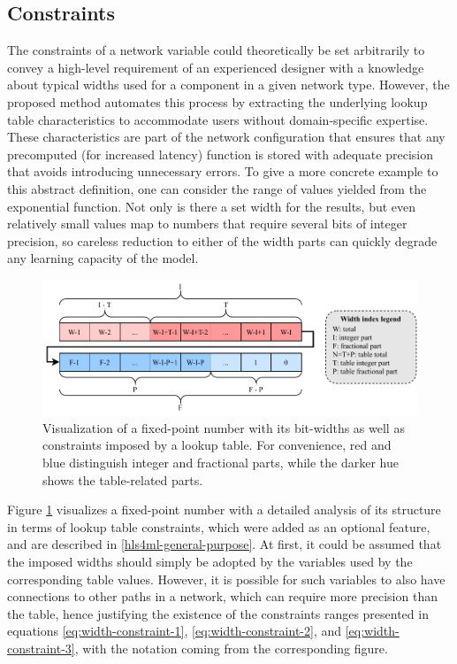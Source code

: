 \subsection{Constraints}
The constraints of a network variable could theoretically be set arbitrarily to convey a high-level requirement of an experienced designer with a knowledge about typical widths used for a component in a given network type. However, the proposed method automates this process by extracting the underlying lookup table characteristics to accommodate users without domain-specific expertise. These characteristics are part of the network configuration that ensures that any precomputed (for increased latency) function is stored with adequate precision that avoids introducing unnecessary errors. To give a more concrete example to this abstract definition, one can consider the range of values yielded from the exponential function. Not only is there a set width for the results, but even relatively small values map to numbers that require several bits of integer precision, so careless reduction to either of the width parts can quickly degrade any learning capacity of the model.

\begin{figure}[hpt!]
  \centering
  \includegraphics[trim={0cm 0cm 0cm 0cm}, width=1.0\textwidth, center]{quantization/width_constraints.pdf}
  \caption{Visualization of a fixed-point number with its bit-widths as well as constraints imposed by a lookup table. For convenience, red and blue distinguish integer and fractional parts, while the darker hue shows the table-related parts.}
  \label{fig:width-constraints}
\end{figure}

Figure \ref{fig:width-constraints} visualizes a fixed-point number with a detailed analysis of its structure in terms of lookup table constraints, which were added as an optional feature, and are described in \cref{hls4ml-general-purpose}. At first, it could be assumed that the imposed widths should simply be adopted by the variables used by the corresponding table values. However, it is possible for such variables to also have connections to other paths in a network, which can require more precision than the table, hence justifying the existence of the constraints ranges presented in equations \ref{eq:width-constraint-1}, \ref{eq:width-constraint-2}, and \ref{eq:width-constraint-3}, with the notation coming from the corresponding figure.

